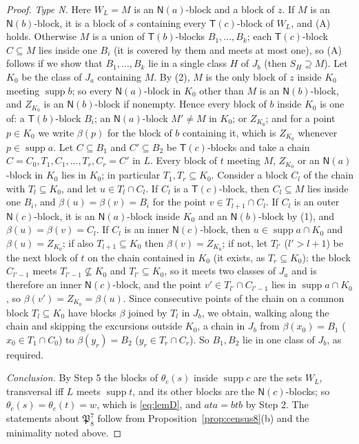 \documentclass[11pt]{amsart}
\theoremstyle{definition}
\newcommand{\supp}{\operatorname{supp}}
\newcommand{\T}{\mathsf{T}}
\newcommand{\N}{\mathsf{N}}
\begin{document}
\begin{proof}
\emph{Type N.} Here $W_L=M$ is an $\N(a)$-block and a block of $z$. If $M$ is an $\N(b)$-block, it is a block of $s$ containing every $\T(c)$-block of $W_L$, and (A) holds. Otherwise $M$ is a union of $\T(b)$-blocks $B_1,\dots,B_k$; each $\T(c)$-block $C\subseteq M$ lies inside one $B_i$ (it is covered by them and meets at most one), so (A) follows if we show that $B_1,\dots,B_k$ lie in a single class $H$ of $J_b$ (then $S_H\supseteq M$). Let $K_0$ be the class of $J_a$ containing $M$. By (2), $M$ is the only block of $z$ inside $K_0$ meeting $\supp b$; so every $\N(a)$-block in $K_0$ other than $M$ is an $\N(b)$-block, and $Z_{K_0}$ is an $\N(b)$-block if nonempty. Hence every block of $b$ inside $K_0$ is one of: a $\T(b)$-block $B_i$; an $\N(a)$-block $M'\ne M$ in $K_0$; or $Z_{K_0}$; and for a point $p\in K_0$ we write $\beta(p)$ for the block of $b$ containing it, which is $Z_{K_0}$ whenever $p\in\supp a$. Let $C\subseteq B_1$ and $C'\subseteq B_2$ be $\T(c)$-blocks and take a chain $C=C_0,T_1,C_1,\dots,T_r,C_r=C'$ in $L$. Every block of $t$ meeting $M$, $Z_{K_0}$ or an $\N(a)$-block in $K_0$ lies in $K_0$; in particular $T_1,T_r\subseteq K_0$. Consider a block $C_l$ of the chain with $T_l\subseteq K_0$, and let $u\in T_l\cap C_l$. If $C_l$ is a $\T(c)$-block, then $C_l\subseteq M$ lies inside one $B_i$, and $\beta(u)=\beta(v)=B_i$ for the point $v\in T_{l+1}\cap C_l$. If $C_l$ is an outer $\N(c)$-block, it is an $\N(a)$-block inside $K_0$ and an $\N(b)$-block by (1), and $\beta(u)=\beta(v)=C_l$. If $C_l$ is an inner $\N(c)$-block, then $u\in\supp a\cap K_0$ and $\beta(u)=Z_{K_0}$; if also $T_{l+1}\subseteq K_0$ then $\beta(v)=Z_{K_0}$; if not, let $T_{l'}$ ($l'>l+1$) be the next block of $t$ on the chain contained in $K_0$ (it exists, as $T_r\subseteq K_0$): the block $C_{l'-1}$ meets $T_{l'-1}\not\subseteq K_0$ and $T_{l'}\subseteq K_0$, so it meets two classes of $J_a$ and is therefore an inner $\N(c)$-block, and the point $v'\in T_{l'}\cap C_{l'-1}$ lies in $\supp a\cap K_0$, so $\beta(v')=Z_{K_0}=\beta(u)$. Since consecutive points of the chain on a common block $T_l\subseteq K_0$ have blocks $\beta$ joined by $T_l$ in $J_b$, we obtain, walking along the chain and skipping the excursions outside $K_0$, a chain in $J_b$ from $\beta(x_0)=B_1$ ($x_0\in T_1\cap C_0$) to $\beta(y_r)=B_2$ ($y_r\in T_r\cap C_r$). So $B_1,B_2$ lie in one class of $J_b$, as required.

\emph{Conclusion.} By Step 5 the blocks of $\theta_c(s)$ inside $\supp c$ are the sets $W_L$, transversal iff $L$ meets $\supp t$, and its other blocks are the $\N(c)$-blocks; so $\theta_c(s)=\theta_c(t)=w$, which is \eqref{eq:lemD}, and $ata=btb$ by Step 2. The statements about $\mathfrak P_8^7$ follow from Proposition~\ref{prop:census8}(b) and the minimality noted above.
\end{proof}
\end{document}
